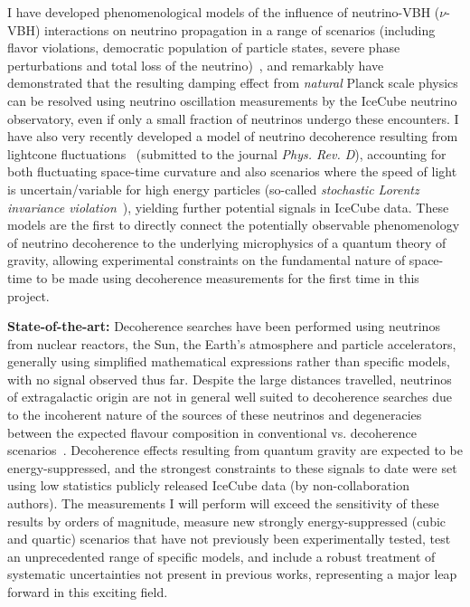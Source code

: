 \documentclass[a4paper,11pt]{article}
\begin{document}
I have developed phenomenological models of the influence of neutrino-VBH ($\nu$-VBH) interactions on neutrino propagation in a range of scenarios (including flavor violations, democratic population of particle states, severe phase perturbations and total loss of the neutrino)~\cite{PhysRevD.102.115003}, and remarkably have demonstrated that the resulting damping effect from \textit{natural} Planck scale physics can be resolved using neutrino oscillation measurements by the IceCube neutrino observatory, even if only a small fraction of neutrinos undergo these encounters. I have also very recently developed a model of neutrino decoherence resulting from lightcone fluctuations~\cite{2103.15313} (submitted to the journal \textit{Phys. Rev. D}), accounting for both fluctuating space-time curvature and also scenarios where the speed of light is uncertain/variable for high energy particles (so-called \textit{stochastic Lorentz invariance violation}~\cite{Vasileiou2015}), yielding further potential signals in IceCube data. These models are the first to directly connect the potentially observable phenomenology of neutrino decoherence to the underlying microphysics of a quantum theory of gravity, allowing experimental constraints on the fundamental nature of space-time to be made using decoherence measurements for the first time in this project.

\textbf{State-of-the-art:} Decoherence searches have been performed using neutrinos from nuclear reactors, the Sun, the Earth's atmosphere and particle accelerators, generally using simplified mathematical expressions rather than specific models, with no signal observed thus far. Despite the large distances travelled, neutrinos of extragalactic origin are not in general well suited to decoherence searches due to the incoherent nature of the sources of these neutrinos and degeneracies between the expected flavour composition in conventional vs. decoherence scenarios~\cite{PhysRevD.102.115003}. Decoherence effects resulting from quantum gravity are expected to be energy-suppressed, and the strongest constraints to these signals to date were set using low statistics publicly released IceCube data (by non-collaboration authors). The measurements I will perform will exceed the sensitivity of these results by orders of magnitude, measure new strongly energy-suppressed (cubic and quartic) scenarios that have not previously been experimentally tested, test an unprecedented range of specific models, and include a robust treatment of systematic uncertainties not present in previous works, representing a major leap forward in this exciting field. \\
\end{document}
